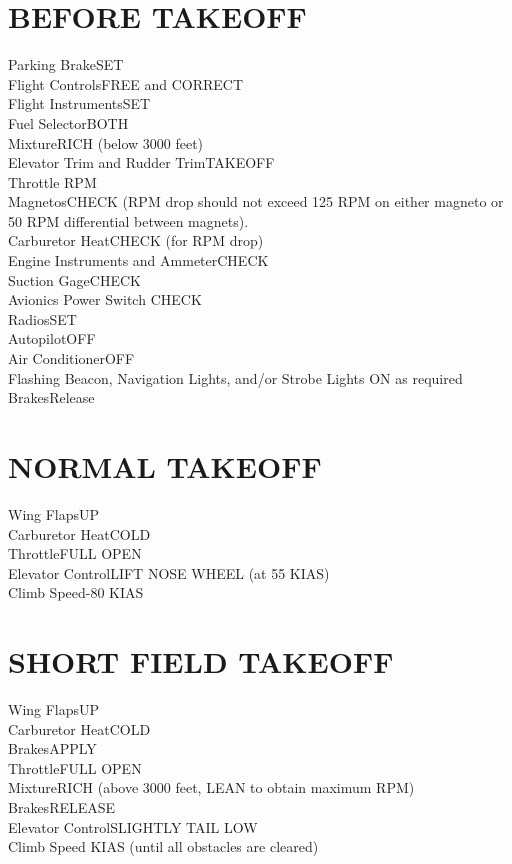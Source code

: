 \documentclass{article}
\begin{document}
\begin{multicols*}{2}
\section*{BEFORE TAKEOFF}
Parking Brake\dotfill SET\\
Flight Controls\dotfill FREE and CORRECT\\
Flight Instruments\dotfill SET\\
Fuel Selector\dotfill BOTH\\
Mixture\dotfill RICH (below 3000 feet)\\
Elevator Trim and Rudder Trim\dotfill TAKEOFF\\
Throttle RPM\\
\hspace*{6mm}Magnetos\dotfill CHECK (RPM drop should not exceed 125 RPM on either magneto or 50 RPM differential between magnets).\\
\hspace*{6mm}Carburetor Heat\dotfill CHECK (for RPM drop)\\
\hspace*{6mm}Engine Instruments and Ammeter\dotfill CHECK\\
\hspace*{6mm}Suction Gage\dotfill CHECK\\
Avionics Power Switch \dotfill CHECK\\
Radios\dotfill SET\\
Autopilot\dotfill OFF\\
Air Conditioner\dotfill OFF\\
Flashing Beacon, Navigation Lights, and/or Strobe Lights \dotfill ON as required\\
Brakes\dotfill Release
\section*{NORMAL TAKEOFF}
Wing Flaps\dotfill UP\\
Carburetor Heat\dotfill COLD\\
Throttle\dotfill FULL OPEN\\
Elevator Control\dotfill LIFT NOSE WHEEL (at 55 KIAS)\\
Climb Speed-80 KIAS
\section*{SHORT FIELD TAKEOFF}
Wing Flaps\dotfill UP\\
Carburetor Heat\dotfill COLD\\
Brakes\dotfill APPLY\\
Throttle\dotfill FULL OPEN\\
Mixture\dotfill RICH (above 3000 feet, LEAN to obtain maximum RPM)\\
Brakes\dotfill RELEASE\\
Elevator Control\dotfill SLIGHTLY TAIL LOW\\
Climb Speed KIAS (until all obstacles are cleared)
\vfill\null

\end{multicols*}
\end{document}
